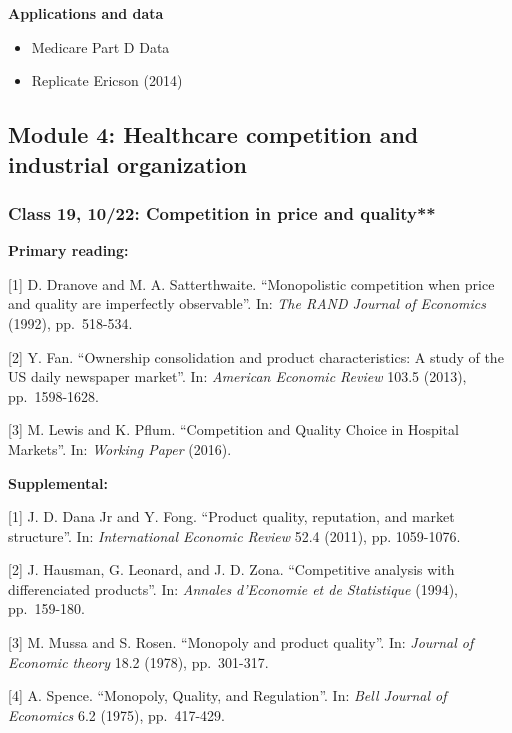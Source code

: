 \documentclass[11pt,]{article}
\providecommand{\tightlist}{%
  \setlength{\itemsep}{0pt}\setlength{\parskip}{0pt}}
\begin{document}
\textbf{Applications and data}

\begin{itemize}
\tightlist
\item
  Medicare Part D Data
\item
  Replicate Ericson (2014)
\end{itemize}

\hypertarget{module-4-healthcare-competition-and-industrial-organization}{%
\subsection{Module 4: Healthcare competition and industrial
organization}\label{module-4-healthcare-competition-and-industrial-organization}}

\hypertarget{class-19-1022-competition-in-price-and-quality}{%
\subsubsection{Class 19, 10/22: Competition in price and
quality**}\label{class-19-1022-competition-in-price-and-quality}}

\textbf{Primary reading:}

{[}1{]} D. Dranove and M. A. Satterthwaite. ``Monopolistic competition
when price and quality are imperfectly observable''. In: \emph{The RAND
Journal of Economics} (1992), pp.~518-534.

{[}2{]} Y. Fan. ``Ownership consolidation and product characteristics: A
study of the US daily newspaper market''. In: \emph{American Economic
Review} 103.5 (2013), pp.~1598-1628.

{[}3{]} M. Lewis and K. Pflum. ``Competition and Quality Choice in
Hospital Markets''. In: \emph{Working Paper} (2016).

\textbf{Supplemental:}

{[}1{]} J. D. Dana Jr and Y. Fong. ``Product quality, reputation, and
market structure''. In: \emph{International Economic Review} 52.4
(2011), pp. 1059-1076.

{[}2{]} J. Hausman, G. Leonard, and J. D. Zona. ``Competitive analysis
with differenciated products''. In: \emph{Annales d'Economie et de
Statistique} (1994), pp.~159-180.

{[}3{]} M. Mussa and S. Rosen. ``Monopoly and product quality''. In:
\emph{Journal of Economic theory} 18.2 (1978), pp.~301-317.

{[}4{]} A. Spence. ``Monopoly, Quality, and Regulation''. In: \emph{Bell
Journal of Economics} 6.2 (1975), pp.~417-429.
\end{document}
